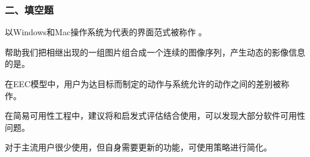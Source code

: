 \subsubsection*{二、填空题}
\setcounter{problemname}{0}

\begin{problem}
以Windows和Mac操作系统为代表的界面范式被称作 。
\end{problem}


\begin{problem}
帮助我们把相继出现的一组图片组合成一个连续的图像序列，产生动态的影像信息的是。
\end{problem}


\begin{problem}
在EEC模型中，用户为达目标而制定的动作与系统允许的动作之间的差别被称作。
\end{problem}



\begin{problem}
在简易可用性工程中，建议将和启发式评估结合使用，可以发现大部分软件可用性问题。
\end{problem}



\begin{problem}
对于主流用户很少使用，但自身需要更新的功能，可使用策略进行简化。
\end{problem}


